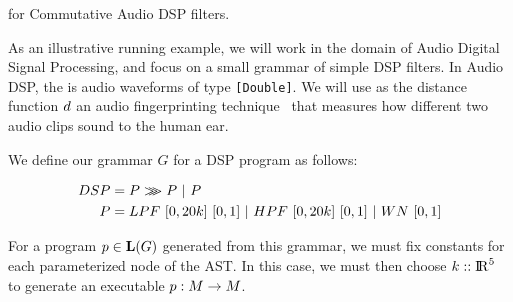 \begin{exmp}
\approximatePBE for Commutative Audio DSP filters.

As an illustrative running example, we will work in the domain of Audio Digital Signal Processing, and focus on a small grammar of simple DSP filters.
In Audio DSP, the \exampleDomain is audio waveforms of type \texttt{[Double]}.
We will use as the distance function ${d}$ an audio fingerprinting technique~\cite{SantolucitoFARM} that measures how different two audio clips sound to the human ear.

We define our grammar $G$ for a DSP program as follows:

\begin{align*}
DSP &= P \arrComp P\ |\ P \\
P   & = LPF \ [0,20k] \ [0,1] \ |\ HPF \ [0,20k] \ [0,1] \ |\ WN \ [0,1]
\end{align*}

For a program $p \in \mathbf{L}(G)$ generated from this grammar, we must fix constants for each parameterized node of the AST.
In this case, we must then choose ${k} :: {\rm I\!R}^{5}$ to generate an executable $p:M \to M$. 

\end{exmp}

